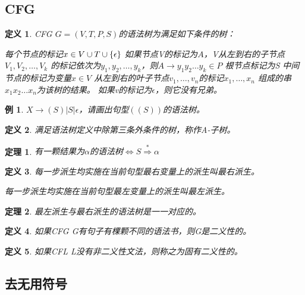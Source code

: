 \documentclass{ctexart}
\newtheorem{definition}{定义}[section]
\newtheorem{example}{例}[section]
\newtheorem{theorem}{定理}[section]
\DeclarePairedDelimiter{\set}{\{}{\}}
\begin{document}
\subsection{CFG}
\begin{definition}
    CFG $G=(V, T, P, S)$的语法树为满足如下条件的树：

    \begin{outline}[enumerate]
        \1 每个节点的标记$x \in V \cup T \cup \set{\epsilon}$
        \1 如果节点V的标记为$A$，V从左到右的子节点$V_1,V_2,\dots,V_k$
        的标记依次为$y_1,y_2,\dots,y_k$，则$A \to y_1y_2\dots y_k \in P$
        \1 根节点标记为S
        \1 中间节点的标记为变量$x \in V$
        \1 从左到右的叶子节点$v_1,\dots,v_n$的标记$x_1,\dots,x_n$
        组成的串$x_1x_2\dots x_n$为该树的结果。
        \1 如果v的标记为$\epsilon$，则它没有兄弟。
    \end{outline}
\end{definition}
\begin{example}
    $X \to (S) | S | \epsilon$，请画出句型$((S))$的语法树。
\end{example}
\begin{definition}
    满足语法树定义中除第三条外条件的树，称作A-子树。
\end{definition}
\begin{theorem}
    有一颗结果为$\alpha$的语法树$\iff S \overset{*} \Rightarrow \alpha $
\end{theorem}
\begin{definition}
    每一步派生均实施在当前句型最右变量上的派生叫最右派生。

    每一步派生均实施在当前句型最左变量上的派生叫最左派生。
\end{definition}
\begin{theorem}
    最左派生与最右派生的语法树是一一对应的。
\end{theorem}
\begin{definition}
    如果CFG G有句子有棵颗不同的语法书，则G是二义性的。
\end{definition}
\begin{definition}
    如果CFL L没有非二义性文法，则称之为固有二义性的。
\end{definition}
\subsection{去无用符号}
\end{document}
